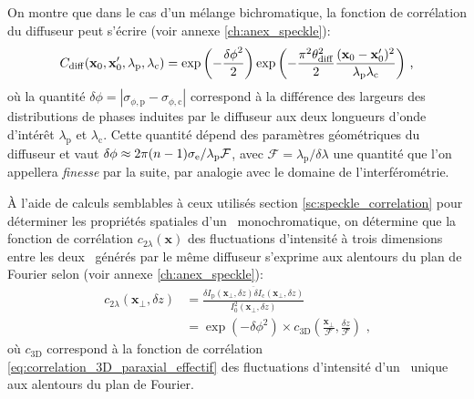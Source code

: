 On montre que dans le cas d'un mélange bichromatique, la fonction de corrélation du diffuseur peut s'écrire (voir annexe \ref{ch:anex_speckle}):
\begin{equation}
C_{\mathrm{diff}}(\mathbf{x}_0,\mathbf{x}_0',\lambda_{\mathrm{p}},\lambda_{\mathrm{c}})=\exp{\left( -\frac{{\delta\phi}^2}{2}\right) } \exp{\left( -\frac{\pi^2 \theta_{\mathrm{diff}}^2}{2}\frac{(\mathbf{x}_0- \mathbf{x}_0')^2}{\lambda_{\mathrm{p}} \lambda_{\mathrm{c}}} \right)} \text{ ,}
\end{equation}
où la quantité $\delta\phi=\left| \sigma_{\phi,\mathrm{p}} - \sigma_{\phi,\mathrm{c}} \right|$  correspond à la différence des largeurs des distributions de phases induites par le diffuseur aux deux longueurs d'onde d'intérêt $\lambda_{\mathrm{p}}$ et $\lambda_{\mathrm{c}}$. Cette quantité dépend des paramètres géométriques du diffuseur et vaut $\delta\phi\approx 2\pi (n-1) \sigma_{\mathrm{e}}/\lambda_{\mathrm{p}}\mathcal{F}$, avec $\mathcal{F}=\lambda_{\mathrm{p}}/\delta\lambda$ une quantité que l'on appellera \emph{finesse} par la suite, par analogie avec le domaine de l'interférométrie.


À l'aide de calculs semblables à ceux utilisés section \ref{sc:speckle_correlation} pour déterminer les propriétés spatiales d'un \speckle\ monochromatique, on détermine que la fonction de corrélation $c_{2\lambda}(\mathbf{x})$ des fluctuations d'intensité à trois dimensions entre les deux \speckles\ générés par le même diffuseur s'exprime aux alentours du plan de Fourier selon (voir annexe \ref{ch:anex_speckle}):
\begin{align}
\nonumber c_{\mathrm{2}\lambda} (\mathbf{x}_{\perp},\delta z) &=\frac{\overline{\delta I_{\mathrm{p}}(\mathbf{x}_{\perp},\delta z) \delta I_{\mathrm{c}}(\mathbf{x}_{\perp},\delta z)}}{I_0^2(\mathbf{x}_{\perp},\delta z)}\\
&=\exp{\left( -\delta\phi^2 \right)}\times c_{\mathrm{3D}}\left(  \frac{\mathbf{x}_{\perp}}{\mathcal{F}}, \frac{\delta z}{\mathcal{F}} \right) \text{ ,}
\label{eq:correlation_2_lambda}
\end{align}
où $c_{\mathrm{3D}}$ correspond à la fonction de corrélation \ref{eq:correlation_3D_paraxial_effectif} des fluctuations d'intensité d'un \speckle\ unique aux alentours du plan de Fourier. 

